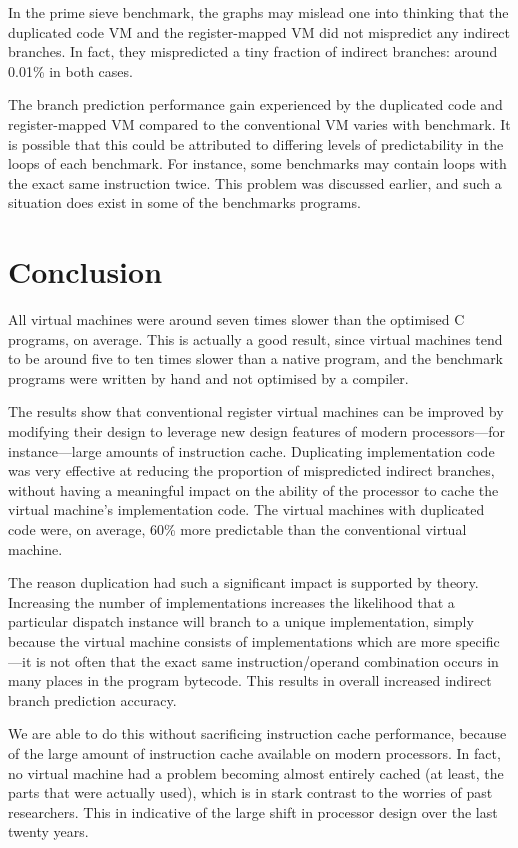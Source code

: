 		In the prime sieve benchmark, the graphs may mislead one into thinking that the duplicated code VM and the register-mapped VM did not mispredict any indirect branches. In fact, they mispredicted a tiny fraction of indirect branches: around 0.01\% in both cases.
		
		The branch prediction performance gain experienced by the duplicated code and register-mapped VM compared to the conventional VM varies with benchmark. It is possible that this could be attributed to differing levels of predictability in the loops of each benchmark. For instance, some benchmarks may contain loops with the exact same instruction twice. This problem was discussed earlier, and such a situation does exist in some of the benchmarks programs.
		
\chapter{Conclusion}
	All virtual machines were around seven times slower than the optimised C programs, on average. This is actually a good result, since virtual machines tend to be around five to ten times slower than a native program, and the benchmark programs were written by hand and not optimised by a compiler. 
	
	The results show that conventional register virtual machines can be improved by modifying their design to leverage new design features of modern processors---for instance---large amounts of instruction cache. Duplicating implementation code was very effective at reducing the proportion of mispredicted indirect branches, without having a meaningful impact on the ability of the processor to cache the virtual machine's implementation code. The virtual machines with duplicated code were, on average, 60\% more predictable than the conventional virtual machine.
	
	The reason duplication had such a significant impact is supported by theory. Increasing the number of implementations increases the likelihood that a particular dispatch instance will branch to a unique implementation, simply because the virtual machine consists of implementations which are more specific---it is not often that the exact same instruction/operand combination occurs in many places in the program bytecode. This results in overall increased indirect branch prediction accuracy. 
	
	We are able to do this without sacrificing instruction cache performance, because of the large amount of instruction cache available on modern processors. In fact, no virtual machine had a problem becoming almost entirely cached (at least, the parts that were actually used), which is in stark contrast to the worries of past researchers. This in indicative of the large shift in processor design over the last twenty years.
	
